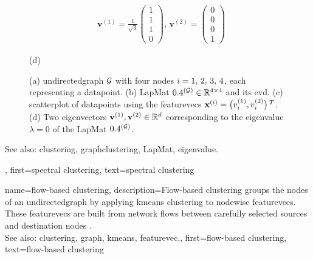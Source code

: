 {{\begin{figure}[H]
\begin{center}
\begin{minipage}{0.4\textwidth}
\begin{align}
					&	\mathbf{v}^{(1)}\!=\!\frac{1}{\sqrt{3}} \begin{pmatrix} 1 \\ 1 \\ 1 \\ 0 \end{pmatrix}, \,
					\mathbf{v}^{(2)}\!=\!\begin{pmatrix} 0 \\ 0 \\ 0 \\ 1 \end{pmatrix} \nonumber 
					\end{align}
					\begin{minipage}{\textwidth}
						\vspace{3ex}
						\centering
						{\selectfont (d)}
					\end{minipage}
				\end{minipage} 
		\caption{\label{fig_lap_mtx_specclustering_dict} (a) \Gls{undirectedgraph} 
			$\mathcal{G}$ with four nodes $i=1,\,2,\,3,\,4$, each representing a \gls{datapoint}. (b) \gls{LapMat} 
			$0.4^{(\mathcal{G})} \in \mathbb{R}^{4 \times 4}$ and its \gls{evd}. 
			(c) \Gls{scatterplot} of \glspl{datapoint} using the \glspl{featurevec} 
			${\bf x}^{(i)} = \big( v^{(1)}_{i},v^{(2)}_{i} \big)\,^{T}$. 
			(d) Two \glspl{eigenvector} ${\bf v}^{(1)},{\bf v}^{(2)} \in \mathbb{R}^{d}$ 
			corresponding to the \gls{eigenvalue} $\lambda=0$ of the \gls{LapMat} $0.4^{(\mathcal{G})}$. } 
			\end{center}
		\end{figure}
		See also: \gls{clustering}, \gls{graphclustering}, \gls{LapMat}, \gls{eigenvalue}.}, 
	first={spectral clustering},
	text={spectral clustering} 
}

{name={flow-based clustering},
	description={Flow-based \gls{clustering} groups the nodes 
		of an \gls{undirectedgraph} by applying \gls{kmeans} \gls{clustering} to nodewise 
		\glspl{featurevec}. These \glspl{featurevec} are built from network flows between 
		carefully selected sources and destination nodes \cite{FlowSpecClustering2021}. 
					\\ 
		See also: \gls{clustering}, \gls{graph}, \gls{kmeans}, \gls{featurevec}.}, 
	first={flow-based clustering},
	text={flow-based clustering} 
}

